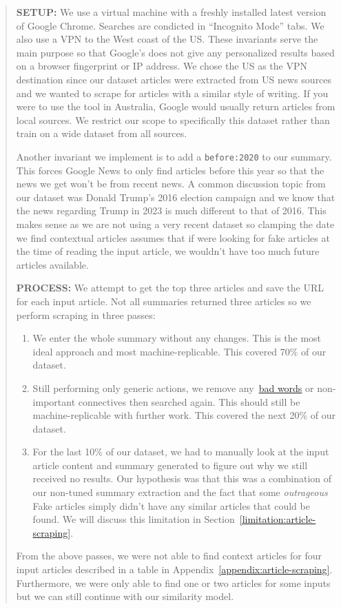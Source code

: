 \documentclass{article}
\begin{document}
\begin{quote}
  \textbf{SETUP:} We use a virtual machine with a freshly installed latest version of Google Chrome. Searches are condicted in ``Incognito Mode'' tabs. We also use a VPN to the West coast of the US. These invariants serve the main purpose so that Google's does not give any personalized results based on a browser fingerprint or IP address. We chose the US as the VPN destination since our dataset articles were extracted from US news sources and we wanted to scrape for articles with a similar style of writing. If you were to use the tool in Australia, Google would usually return articles from local sources. We restrict our scope to specifically this dataset rather than train on a wide dataset from all sources.

  Another invariant we implement is to add a \verb|before:2020| to our summary. This forces Google News to only find articles before this year so that the news we get won't be from recent news. A common discussion topic from our dataset was Donald Trump's 2016 election campaign and we know that the news regarding Trump in 2023 is much different to that of 2016. This makes sense as we are not using a very recent dataset so clamping the date we find contextual articles assumes that if were looking for fake articles at the time of reading the input article, we wouldn't have too much future articles available.

  \textbf{PROCESS:} We attempt to get the top three articles and save the URL for each input article. Not all summaries returned three articles so we perform scraping in three passes:
  \begin{enumerate}
    \item We enter the whole summary without any changes. This is the most ideal approach and most machine-replicable. This covered 70\% of our dataset.
    \item Still performing only generic actions, we remove any~\hyperref[summary-extraction:bad-words]{\color{blue}bad words} or non-important connectives then searched again. This should still be machine-replicable with further work. This covered the next 20\% of our dataset.
    \item For the last 10\% of our dataset, we had to manually look at the input article content and summary generated to figure out why we still received no results. Our hypothesis was that this was a combination of our non-tuned summary extraction and the fact that some \emph{outrageous} Fake articles simply didn't have any similar articles that could be found. We will discuss this limitation in Section~\ref{limitation:article-scraping}.
  \end{enumerate}
  From the above passes, we were not able to find context articles for four input articles described in a table in Appendix~\ref{appendix:article-scraping}. Furthermore, we were only able to find one or two articles for some inputs but we can still continue with our similarity model.
\end{quote}
\end{document}
